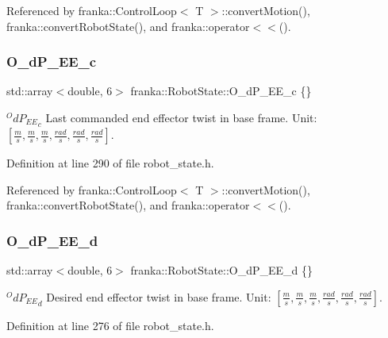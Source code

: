 Referenced by franka\+::\+Control\+Loop$<$ T $>$\+::convert\+Motion(), franka\+::convert\+Robot\+State(), and franka\+::operator$<$$<$().

\mbox{\label{structfranka_1_1RobotState_a4be112bd1a9a7d777a67aea4a18a8dcc}} 
\subsubsection{\texorpdfstring{O\+\_\+d\+P\+\_\+\+E\+E\+\_\+c}{O\_dP\_EE\_c}}
{\footnotesize\ttfamily std\+::array$<$double, 6$>$ franka\+::\+Robot\+State\+::\+O\+\_\+d\+P\+\_\+\+E\+E\+\_\+c \{\}}

${^OdP_{EE}}_{c}$ Last commanded end effector twist in base frame. Unit\+: $[\frac{m}{s},\frac{m}{s},\frac{m}{s},\frac{rad}{s},\frac{rad}{s},\frac{rad}{s}]$. 

Definition at line 290 of file robot\+\_\+state.\+h.



Referenced by franka\+::\+Control\+Loop$<$ T $>$\+::convert\+Motion(), franka\+::convert\+Robot\+State(), and franka\+::operator$<$$<$().

\mbox{\label{structfranka_1_1RobotState_a1e0a82b98534929c3061295d5761d607}} 
\subsubsection{\texorpdfstring{O\+\_\+d\+P\+\_\+\+E\+E\+\_\+d}{O\_dP\_EE\_d}}
{\footnotesize\ttfamily std\+::array$<$double, 6$>$ franka\+::\+Robot\+State\+::\+O\+\_\+d\+P\+\_\+\+E\+E\+\_\+d \{\}}

${^OdP_{EE}}_{d}$ Desired end effector twist in base frame. Unit\+: $[\frac{m}{s},\frac{m}{s},\frac{m}{s},\frac{rad}{s},\frac{rad}{s},\frac{rad}{s}]$. 

Definition at line 276 of file robot\+\_\+state.\+h.



